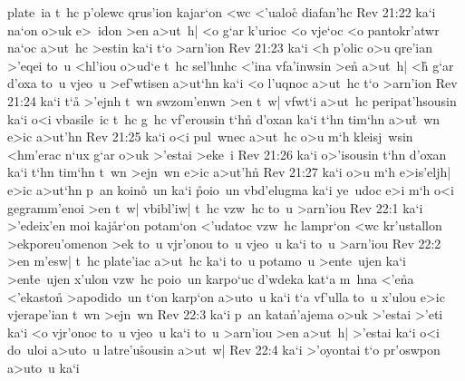 plate~ia
t~hc
p'olewc
qrus'ion
kajar`on
<wc
<'ualoc\r{}
diafan'hc\bibvsend
\vs Rev 21:22
ka`i
na`on
o>uk
e>~idon
>en
a>ut~h|
<o
g`ar
k'urioc
<o
vje`oc
<o
pantokr'atwr
na`oc
a>ut~hc
>estin
ka`i
t`o
>arn'ion\bibvsend
\vs Rev 21:23
ka`i
<h
p'olic
o>u
qre'ian
>'eqei
to~u
<hl'iou
o>ud`e
t~hc
sel'hnhc
<'ina
vfa'inwsin
>e\r{n}
a>ut~h|
<h\r{}
g`ar
d'oxa
to~u
vjeo~u
>ef'wtisen
a>ut`hn
ka`i
<o
l'uqnoc
a>ut~hc
t`o
>arn'ion\bibvsend
\vs Rev 21:24
ka`i
t`a\r{}
>'ejnh
t~wn
swzom'enwn
>en
t~w|
vfwt`i
a>ut~hc
peripat'hsousin
ka`i
o<i
vbasile~ic
t~hc
g~hc
vf'erousin
t`hn\r{}
d'oxan
ka`i
t`hn
tim`hn
a>u\r{t}~wn
e>ic
a>ut'hn\bibvsend
\vs Rev 21:25
ka`i
o<i
pul~wnec
a>ut~hc
o>u
m`h
kleisj~wsin
<hm'erac
n`ux
g`ar
o>uk
>'estai
>eke~i\bibvsend
\vs Rev 21:26
ka`i
o>'isousin
t`hn
d'oxan
ka`i
t`hn
tim`hn
t~wn
>ejn~wn
e>ic
a>ut'h\r{n}\bibvsend
{}
\vs Rev 21:27
ka`i
o>u
m`h
e>is'eljh|
e>ic
a>ut`hn
p~an
koin\r{o}~un
ka`i
\r{p}oio~un
vbd'elugma
ka`i
ye~udoc
e>i
m`h
o<i
gegramm'enoi
>en
t~w|
vbibl'iw|
t~hc
vzw~hc
to~u
>arn'iou\bibvsend
\vs Rev 22:1
ka`i
>'edeix'en
moi
kaj\r{a}r`on
potam`on
<'udatoc
vzw~hc
lampr`on
<wc
kr'ustallon
>ekporeu'omenon
>ek
to~u
vjr'onou
to~u
vjeo~u
ka`i
to~u
>arn'iou\bibvsend
\vs Rev 22:2
>en
m'esw|
t~hc
plate'iac
a>ut~hc
ka`i
to~u
potamo~u
>ente~ujen
ka`i
>en\r{t}e~ujen
x'ulon
vzw~hc
poio~un
karpo`uc
d'wdeka
kat`a
m~hna
<'e\r{n}a
<'ekaston\r{}
>apodido~un
t`on
karp`on
a>uto~u
ka`i
t`a
vf'ulla
to~u
x'ulou
e>ic
vjerape'ian
t~wn
>ejn~wn\bibvsend
\vs Rev 22:3
ka`i
p~an
ka\-ta\-\r{n}'a\-je\-ma
o>uk
>'estai
>'eti
ka`i
<o
vjr'onoc
to~u
vjeo~u
ka`i
to~u
>arn'iou
>en
a>ut~h|
>'estai
ka`i
o<i
do~uloi
a>uto~u
latre'u\r{s}ousin
a>ut~w|\bibvsend
\vs Rev 22:4
ka`i
>'oyontai
t`o
pr'oswpon
a>uto~u
ka`i
